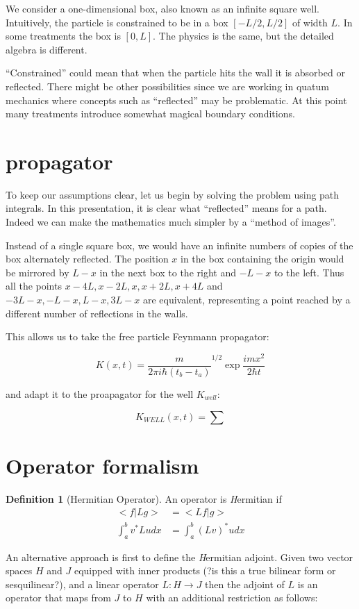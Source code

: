 \documentclass[a4paper, 12pt]{article}
\theoremstyle{definition}
\newtheorem{definition}{Definition}[section]
\begin{document}
We consider a one-dimensional box, also known as an infinite square well. Intuitively, the particle is constrained to be in a box $[-L/2, L/2]$ of width $L$. In some treatments the box is $[0, L]$. The physics is the same, but the detailed algebra is different.

``Constrained'' could mean that when the particle hits the wall it is absorbed or reflected. There might be other possibilities since we are working in quatum mechanics where concepts such as ``reflected'' may be problematic. At this point many treatments introduce somewhat magical boundary conditions. 

\section{propagator}
To keep our assumptions clear, let us begin by solving the problem using path integrals. In this presentation, it is clear what ``reflected'' means for a path. Indeed we can make the mathematics much simpler by a ``method of images''.

Instead of a single square box, we would have an infinite numbers of copies of the box alternately reflected. The position $x$ in the box containing the origin would be mirrored by $L - x$ in the next box to the right and $-L -x$ to the left. Thus all the points $x-4L, x-2L, x, x+2L, x+4L$ and $-3L-x, -L-x, L-x, 3L-x$ are equivalent, representing a point reached by a different number of reflections in the walls.

This allows us to take the free particle Feynmann propagator:

$$K(x,t) = \frac{m}{2\pi i\hbar(t_b - t_a)}^{1/2}\exp{\frac{imx^2}{2\hbar t}}$$

and adapt it to the proapagator for the well $K_{well}$:

$$K_{WELL}(x, t) = \sum$$

\section{Operator formalism}
\begin{definition}[Hermitian Operator]
  An operator is {\emph Hermitian} if
  \begin{align*}
    <f|Lg> &= <Lf |g> \\
\int_{a}^{b}v^{*}Ludx &= \int_{a}^{b}(Lv)^{*}udx
  \end{align*}

\end{definition}
An alternative approach is first to define the {\emph Hermitian adjoint}. Given two vector spaces $H$ and $J$ equipped with inner products (?is this a true bilinear form or sesquilinear?), and a linear operator $L:H\rightarrow J$ then the adjoint of $L$ is an operator that maps from $J$ to $H$ with an additional restriction as follows:
\end{document}
